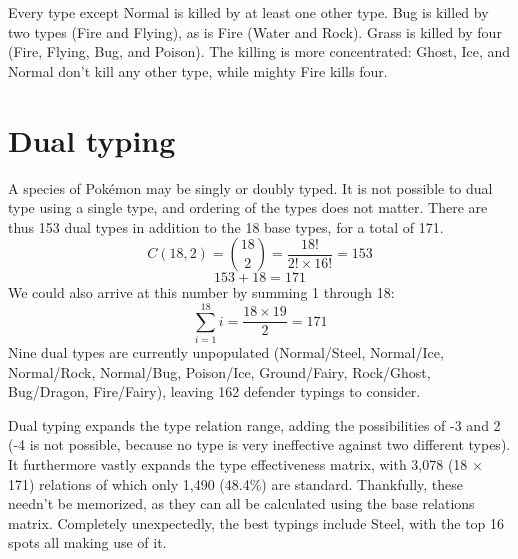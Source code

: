 %
Every type except Normal is killed by at least one other type.
Bug is killed by two types (Fire and Flying), as is Fire (Water and Rock).
Grass is killed by four (Fire, Flying, Bug, and Poison).
The killing is more concentrated: Ghost, Ice, and Normal don't kill
  any other type, while mighty Fire kills four.

\section{Dual typing}
\label{sec:dualtypes}
A species of Pokémon may be singly or doubly typed.
It is not possible to dual type using a single type,
 and ordering of the types does not matter.
There are thus 153 dual types in addition to the 18 base types,
  for a total of 171.
\[ C(18, 2) = \binom{18}{2} = \frac{18!}{2! \times 16!} = 153 \]
\[ 153 + 18 = 171 \]
We could also arrive at this number by summing 1 through 18:
\[ \sum_{i=1}^{18} i = \frac{18 \times 19}{2} = 171 \]
Nine dual types are currently unpopulated (Normal/Steel, Normal/Ice, Normal/Rock,
 Normal/Bug, Poison/Ice, Ground/Fairy, Rock/Ghost, Bug/Dragon, Fire/Fairy),
 leaving 162 defender typings to consider.

Dual typing expands the type relation range, adding the possibilities
 of -3 and 2 (-4 is not possible, because no type is very ineffective against
 two different types).
It furthermore vastly expands the type effectiveness matrix,
 with 3,078 (18 × 171) relations of which only 1,490 (48.4\%) are standard.
Thankfully, these needn't be memorized, as they can all be calculated
 using the base relations matrix.
Completely unexpectedly, the best typings include Steel, with the top 16
 spots all making use of it.

